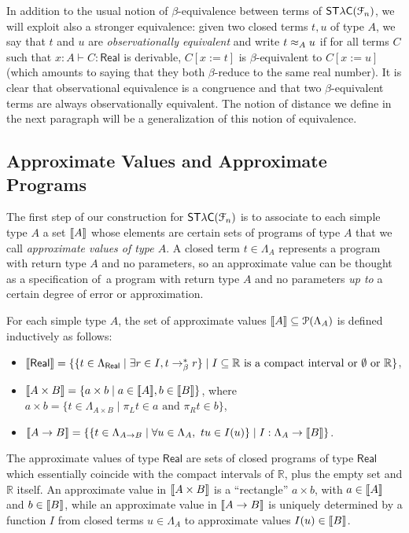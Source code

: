 In addition to the usual notion of $\beta$-equivalence between terms of $\mathsf{ST\lambda C}(\mathcal F_{n})$, we will exploit also a stronger equivalence: given two closed terms $t,u$ of type $A$,  we say that $t$ and $u$ are \emph{observationally equivalent} and write $t \approx_A u$ if for all terms $C$ such that $x:A \vdash C : \mathsf{Real}$ is derivable, $C[x:=t]$ is $\beta$-equivalent to $C[x:=u]$ (which amounts to saying that they both $\beta$-reduce to the same real number).  It is clear that observational equivalence is a congruence and that two $\beta$-equivalent terms are always observationally equivalent. The notion of distance we define in the next paragraph will be a generalization of this notion of equivalence.



\subsection{Approximate Values and Approximate Programs}

The first step of our construction for $\mathsf{ST\lambda C}(\mathcal F_{n})$ is to associate to each simple type $A$ a set $\llbracket A \rrbracket$ whose elements are certain sets of programs of type $A$ that we call \emph{approximate values of type $A$}. 
A closed term $t\in \Lambda_{A}$ represents a program with return type $A$ and no parameters, so an approximate value can be thought as a specification of a program with return type $A$ and no parameters \emph{up to} a certain degree of error or approximation.

For each simple type $A$, the set of approximate values $\llbracket A \rrbracket\subseteq \mathcal P(\Lambda_A)$ is defined inductively as follows:
\begin{itemize}
\item $\llbracket \mathsf{Real} \rrbracket = \{ \{ t \in \Lambda_\mathsf{Real} \mid \exists r \in I, t \to_\beta^* r \} \mid I \subseteq \mathbb{R} \text{ is a compact interval or $\emptyset$ or } \mathbb{R} \}$,
\item $\llbracket A \times B \rrbracket = \{ a \times b \mid a  \in \llbracket A \rrbracket, b \in \llbracket B \rrbracket \}$, where $a \times b = \{ t \in \Lambda_{A \times B} \mid \pi_L t \in a \text{ and } \pi_R t \in b \}$,
\item $\llbracket A \to B \rrbracket = \{ \{ t \in \Lambda_{A \to B} \mid \forall u \in \Lambda_{A},~ tu \in I(u) \} \mid I : \Lambda_A \to \llbracket B \rrbracket \}$.
\end{itemize}

The approximate values of type $\mathsf{Real}$ are sets of closed programs of type $\mathsf{Real}$ which essentially coincide with the compact intervals of $\mathbb R$, plus the empty set and $\mathbb{R}$ itself. An approximate value in $\llbracket A\times B \rrbracket$ is a ``rectangle'' $a \times b$, with $a\in \llbracket A \rrbracket$ and $b \in \llbracket B \rrbracket$, while an approximate value in $\llbracket A\to B \rrbracket$ is uniquely determined by a function 
$I$ from closed terms $u\in \Lambda_{ A}$ to approximate values $I(u)\in \llbracket B \rrbracket$.

